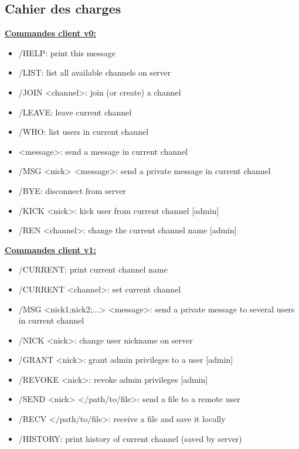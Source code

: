 \documentclass[12pt]{article}
\begin{document}
\subsection{Cahier des charges}
{\large \textbf{\underline{Commandes client v0:}}}
\begin{itemize}
    \item /HELP: print this message
    \item /LIST: list all available channels on server
    \item /JOIN <channel>: join (or create) a channel
    \item /LEAVE: leave current channel
    \item /WHO: list users in current channel
    \item <message>: send a message in current channel
    \item /MSG <nick> <message>: send a private message in current channel
    \item /BYE: disconnect from server
    \item /KICK <nick>: kick user from current channel [admin]
    \item /REN <channel>: change the current channel name [admin]
\end{itemize}

{\large \textbf{\underline{Commandes client v1:}}}
\begin{itemize}
    \item /CURRENT: print current channel name
\item /CURRENT <channel>: set current channel
\item /MSG <nick1;nick2;...> <message>: send a private message to several users in current channel
\item /NICK <nick>: change user nickname on server
\item /GRANT <nick>: grant admin privileges to a user [admin]
\item /REVOKE <nick>: revoke admin privileges [admin]
\item /SEND <nick> </path/to/file>: send a file to a remote user
\item /RECV </path/to/file>: receive a file and save it locally
\item /HISTORY: print history of current channel (saved by server)
\end{itemize}
\end{document}
